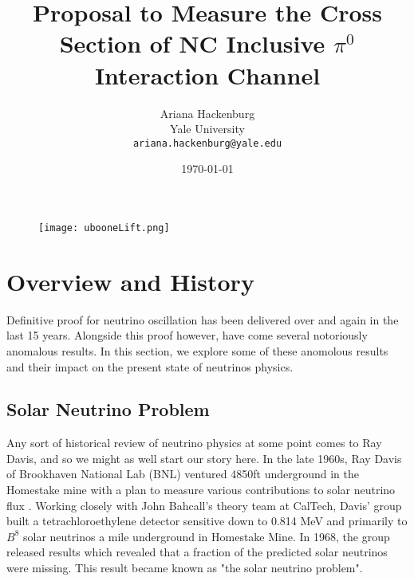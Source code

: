 \documentclass[12pt]{article}
\begin{document}
\title{Proposal to Measure the Cross Section of NC Inclusive $\pi^0$ Interaction Channel }
\author{Ariana Hackenburg  \\Yale University \\ 
			\texttt{ariana.hackenburg@yale.edu}}
\date{\today}
\maketitle

\begin{figure}[h!]
\centering
\texttt{[image: ubooneLift.png]}
\end{figure}

\clearpage

\pagestyle{fancy}%
\fancyhead[C]{}
\renewcommand{\headrulewidth}{0.4pt}%

\tableofcontents
\listoffigures
\setcounter{tocdepth}{3} 

\clearpage

\section{Overview and History}

Definitive proof for neutrino oscillation has been delivered over and again in the last 15 years. Alongside this proof however, have come several notoriously anomalous results. In this section, we explore some of these anomolous results and their impact on the present state of neutrinos physics. 
\subsection{Solar Neutrino Problem}
Any sort of historical review of neutrino physics at some point comes to Ray Davis, and so we might as well start our story here.  In the late 1960s, Ray Davis of Brookhaven National Lab (BNL) ventured 4850ft underground in the Homestake mine with a plan to measure various contributions to solar neutrino flux \cite{ray0}. Working closely with John Bahcall's theory team at CalTech, Davis' group built a tetrachloroethylene detector sensitive down to 0.814 MeV and primarily to $B^8$ solar neutrinos\cite{ray0} a mile underground in Homestake Mine. In 1968, the group released results which revealed that a fraction of the predicted solar neutrinos were missing. This result became known as "the solar neutrino problem".
\end{document}
